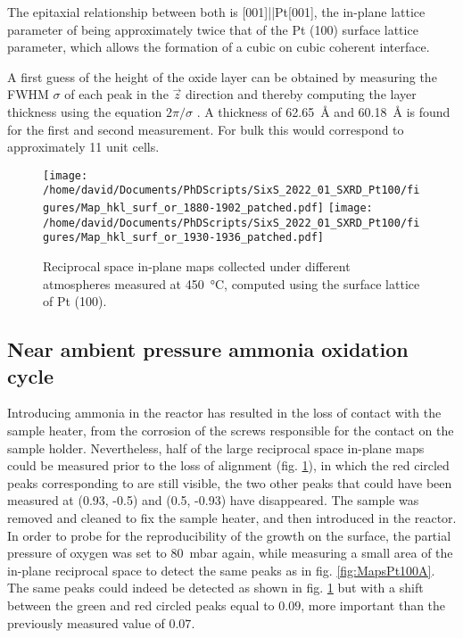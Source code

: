The epitaxial relationship between both is [001]||Pt[001], the in-plane lattice parameter of  being approximately twice that of the Pt (100) surface lattice parameter, which allows the formation of a cubic on cubic coherent interface.

A first guess of the height of the oxide layer can be obtained by measuring the FWHM $\sigma$ of each peak in the $\vec{z}$ direction and thereby computing the layer thickness using the equation $2\pi/\sigma$ \parencite{Warren1990}.
A thickness of \qty{62.65}{\angstrom} and \qty{60.18}{\angstrom} is found for the first and second measurement.
For bulk  this would correspond to approximately 11 unit cells.

\begin{figure}[!htb]
    \centering
    \texttt{[image: /home/david/Documents/PhDScripts/SixS\_2022\_01\_SXRD\_Pt100/figures/Map\_hkl\_surf\_or\_1880-1902\_patched.pdf]}
    \texttt{[image: /home/david/Documents/PhDScripts/SixS\_2022\_01\_SXRD\_Pt100/figures/Map\_hkl\_surf\_or\_1930-1936\_patched.pdf]}
    \caption{
        Reciprocal space in-plane maps collected under different atmospheres measured at \qty{450}{\degreeCelsius}, computed using the surface lattice of Pt (100).
    }
    \label{fig:MapsPt100B}
\end{figure}

\subsection{Near ambient pressure ammonia oxidation cycle}

Introducing ammonia in the reactor has resulted in the loss of contact with the sample heater, from the corrosion of the screws responsible for the contact on the sample holder.
Nevertheless, half of the large reciprocal space in-plane maps could be measured prior to the loss of alignment (fig. \ref{fig:MapsPt100B}), in which the red circled peaks corresponding to  are still visible, the two other peaks that could have been measured at (0.93, -0.5) and (0.5, -0.93) have disappeared.
The sample was removed and cleaned to fix the sample heater, and then introduced in the reactor.
In order to probe for the reproducibility of the  growth on the surface, the partial pressure of oxygen was set to \qty{80}{\milli\bar} again, while measuring a small area of the in-plane reciprocal space to detect the same peaks as in fig. \ref{fig:MapsPt100A}.
The same peaks could indeed be detected as shown in fig. \ref{fig:MapsPt100B} but with a shift between the green and red circled peaks equal to $0.09$, more important than the previously measured value of $0.07$.

